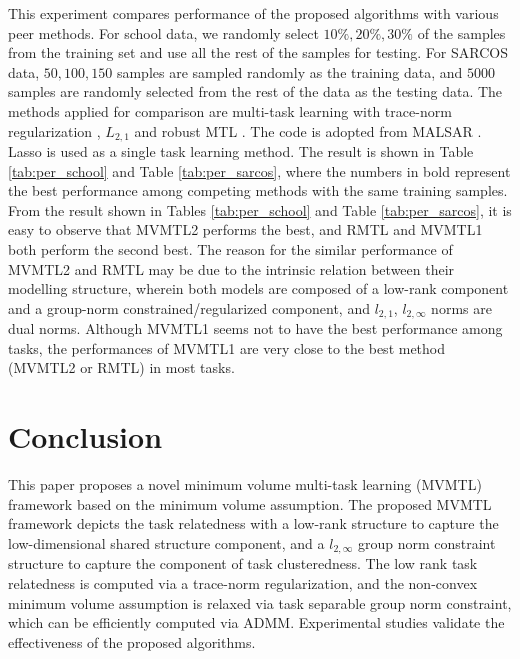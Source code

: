 \documentclass{article}
\newcounter{thm_counter}
\newcounter{pro_counter}
\newcounter{ass_counter}
\begin{document}
This experiment compares performance of the proposed algorithms with various peer methods.
For school data, we randomly select $10\%,20\%,30\%$ of the samples from the training set and use all the rest of the samples for testing. 
For SARCOS data, $50,100,150$ samples are sampled randomly as the training data, and $5000$ samples are randomly selected from the rest of the data as the testing data.
The methods applied for comparison are multi-task learning with trace-norm regularization \cite{ji2009accelerated}, $L_{2,1}$ \cite{mtl:mlj2008:argyriou2008convex} and robust MTL \cite{mtl:kdd2011:ChenZY11}. The code is adopted from MALSAR \cite{zhou2012mutal}. Lasso is used as a single task learning method. The result is shown in Table \ref{tab:per_school} and Table \ref{tab:per_sarcos}, where the numbers in bold represent the best performance among competing methods with the same training samples. From the result shown in Tables \ref{tab:per_school} and Table \ref{tab:per_sarcos}, it is easy to observe that MVMTL2 performs the best, and RMTL and MVMTL1 both perform the second best. The reason for the similar performance of MVMTL2 and RMTL may be due to the intrinsic relation between their modelling structure, wherein both models are composed of a low-rank component and a group-norm constrained/regularized component, and $l_{2,1}$, $l_{2, \infty}$ norms are dual norms. Although MVMTL1 seems not to have the best performance among tasks, the performances of MVMTL1 are very close to the best method (MVMTL2 or RMTL) in most tasks. 


\section{Conclusion}

This paper proposes a novel minimum volume multi-task learning (MVMTL) framework based on the minimum volume assumption. The proposed MVMTL framework depicts the task relatedness with a low-rank structure to capture the low-dimensional shared structure component, and a $l_{2,\infty}$ group norm constraint structure to capture the component of task clusteredness. The low rank task relatedness is computed via a trace-norm regularization, and the non-convex minimum
volume assumption is relaxed via task separable group norm constraint, which
can be efficiently computed via ADMM. Experimental studies validate the effectiveness of the proposed algorithms. 

\newpage


\end{document}
